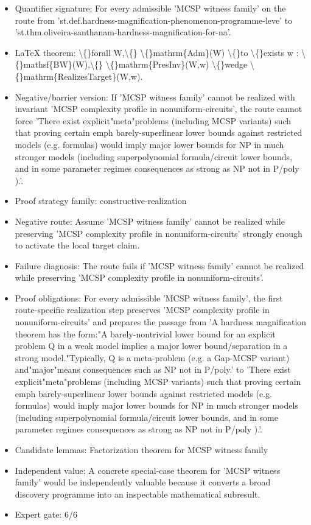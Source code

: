 \documentclass[11pt]{article}
\begin{document}
\begin{itemize}
\item Quantifier signature: For every admissible 'MCSP witness family' on the route from 'st.def.hardness-magnification-phenomenon-programme-leve' to 'st.thm.oliveira-santhanam-hardness-magnification-for-na'.
\item LaTeX theorem: \textbackslash\{\}forall W,\textbackslash\{\} \textbackslash\{\}mathrm\{Adm\}(W) \textbackslash\{\}to \textbackslash\{\}exists w : \textbackslash\{\}mathsf\{BW\}(W),\textbackslash\{\} \textbackslash\{\}mathrm\{PresInv\}(W,w) \textbackslash\{\}wedge \textbackslash\{\}mathrm\{RealizesTarget\}(W,w).
\item Negative/barrier version: If 'MCSP witness family' cannot be realized with invariant 'MCSP complexity profile in nonuniform-circuits', the route cannot force 'There exist explicit"meta"problems (including MCSP variants) such that proving certain emph barely-superlinear lower bounds against restricted models (e.g. formulas) would imply major lower bounds for NP in much stronger models (including superpolynomial formula/circuit lower bounds, and in some parameter regimes consequences as strong as NP not in P/poly ).'.
\item Proof strategy family: constructive-realization
\item Negative route: Assume 'MCSP witness family' cannot be realized while preserving 'MCSP complexity profile in nonuniform-circuits' strongly enough to activate the local target claim.
\item Failure diagnosis: The route fails if 'MCSP witness family' cannot be realized while preserving 'MCSP complexity profile in nonuniform-circuits'.
\item Proof obligations: For every admissible 'MCSP witness family', the first route-specific realization step preserves 'MCSP complexity profile in nonuniform-circuits' and prepares the passage from 'A hardness magnification theorem has the form:"A barely-nontrivial lower bound for an explicit problem Q in a weak model implies a major lower bound/separation in a strong model."Typically, Q is a meta-problem (e.g. a Gap-MCSP variant) and"major"means consequences such as NP not in P/poly.' to 'There exist explicit"meta"problems (including MCSP variants) such that proving certain emph barely-superlinear lower bounds against restricted models (e.g. formulas) would imply major lower bounds for NP in much stronger models (including superpolynomial formula/circuit lower bounds, and in some parameter regimes consequences as strong as NP not in P/poly ).'.
\item Candidate lemmas: Factorization theorem for MCSP witness family
\item Independent value: A concrete special-case theorem for 'MCSP witness family' would be independently valuable because it converts a broad discovery programme into an inspectable mathematical subresult.
\item Expert gate: 6/6
\end{itemize}
\end{document}
